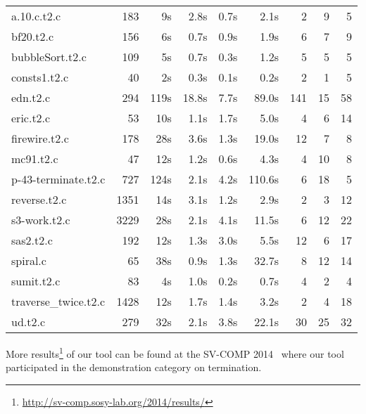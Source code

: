 \begin{center}
\begin{small}
\begin{tabular}{l@{\;\;\;}|@{\;\;\;}r@{\;\;\;}|@{\;\;\;}r@{\;\;\;}|@{\;\;\;}r@{\;\;\;}|@{\;\;\;}r@{\;\;\;}|@{\;\;\;}r@{\;\;\;}|@{\;\;\;}r@{\;\;\;}|@{\;\;\;}r@{\;\;\;}|@{\;\;\;}r}
a.10.c.t2.c 	     &  183 &   9s &  2.8s & 0.7s &  2.1s &   2 &  9 &  5\\
bf20.t2.c 	     &  156 &   6s &  0.7s & 0.9s &  1.9s &   6 &  7 &  9\\
bubbleSort.t2.c      &  109 &   5s &  0.7s & 0.3s &  1.2s &   5 &  5 &  5\\
consts1.t2.c 	     &   40 &   2s &  0.3s & 0.1s &  0.2s&    2 &  1 &  5\\
edn.t2.c 	     &  294 & 119s & 18.8s & 7.7s & 89.0s & 141 & 15 & 58\\
eric.t2.c 	     &   53 &  10s &  1.1s & 1.7s &  5.0s &   4 &  6 & 14\\
firewire.t2.c 	     &  178 &  28s &  3.6s & 1.3s & 19.0s &  12 &  7 &  8\\
mc91.t2.c 	     &   47 &  12s &  1.2s & 0.6s &  4.3s &   4 & 10 &  8\\
p-43-terminate.t2.c  &  727 & 124s &  2.1s & 4.2s & 110.6s &  6 & 18 &  5\\
reverse.t2.c 	     & 1351 &  14s &  3.1s & 1.2s &  2.9s &   2 &  3 & 12\\
s3-work.t2.c  	     & 3229 &  28s &  2.1s & 4.1s & 11.5s &   6 & 12 & 22\\
sas2.t2.c 	     &  192 &  12s &  1.3s & 3.0s &  5.5s &  12 &  6 & 17\\
spiral.c 	     &   65 &  38s &  0.9s & 1.3s & 32.7s &   8 & 12 & 14\\
sumit.t2.c 	     &   83 &   4s &  1.0s & 0.2s &  0.7s &   4 &  2 &  4\\
traverse\_twice.t2.c & 1428 &  12s &  1.7s & 1.4s &  3.2s &   2 &  4 & 18\\
ud.t2.c 	     &  279 &  32s &  2.1s & 3.8s & 22.1s &  30 & 25 & 32\\
\end{tabular}
\end{small}
\end{center}


More results\footnote{\url{http://sv-comp.sosy-lab.org/2014/results/}} of our tool can be found at the SV-COMP 2014~\cite{conf/tacas/Beyer14} where our tool participated in the demonstration category on termination.

